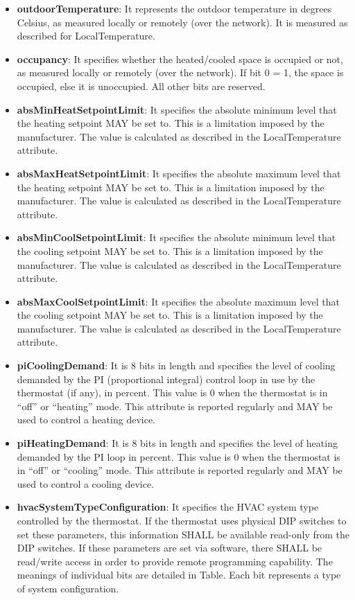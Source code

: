 \begin{itemize}
\item \textbf{outdoorTemperature}: It represents the outdoor temperature in degrees Celsius, as measured locally or remotely (over the network). It is measured as described for LocalTemperature.
\item \textbf{occupancy}: It specifies whether the heated/cooled space is occupied or not, as measured locally or remotely (over the network). If bit 0 = 1, the space is occupied, else it is unoccupied. All other bits are reserved.
\item \textbf{absMinHeatSetpointLimit}: It specifies the absolute minimum level that the heating setpoint MAY be set to. This is a limitation imposed by the manufacturer. The value is calculated as described in the LocalTemperature attribute.
\item \textbf{absMaxHeatSetpointLimit}: It specifies the absolute maximum level that the heating setpoint MAY be set to. This is a limitation imposed by the manufacturer. The value is calculated as described in the LocalTemperature attribute.
\item \textbf{absMinCoolSetpointLimit}: It specifies the absolute minimum level that the cooling setpoint MAY be set to. This is a limitation imposed by the manufacturer. The value is calculated as described in the LocalTemperature attribute.
\item \textbf{absMaxCoolSetpointLimit}: It specifies the absolute maximum level that the cooling setpoint MAY be set to. This is a limitation imposed by the manufacturer. The value is calculated as described in the LocalTemperature attribute.
\item \textbf{piCoolingDemand}: It is 8 bits in length and specifies the level of cooling demanded by the PI (proportional integral) control loop in use by the thermostat (if any), in percent. This value is 0 when the thermostat is in “off” or “heating” mode. This attribute is reported regularly and MAY be used to control a heating device.
\item \textbf{piHeatingDemand}: It is 8 bits in length and specifies the level of heating demanded by the PI loop in percent. This value is 0 when the thermostat is in “off” or “cooling” mode. This attribute is reported regularly and MAY be used to control a cooling device.
\item \textbf{hvacSystemTypeConfiguration}:  It specifies the HVAC system type controlled by the thermostat. If the thermostat uses physical DIP switches to set these parameters, this information SHALL be available read-only from the DIP switches. If these parameters are set via software, there SHALL be read/write access in order to provide remote programming capability. The meanings of individual bits are detailed in Table. Each bit represents a type of system configuration.

\end{itemize}
